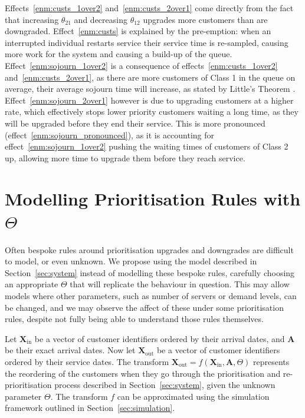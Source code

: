 \documentclass{article}
\begin{document}
Effects~\ref{enm:custs_1over2} and~\ref{enm:custs_2over1} come directly from the
fact that increasing $\theta_{21}$ and decreasing $\theta_{12}$ upgrades more
customers than are downgraded. Effect~\ref{enm:custs} is explained by the
pre-emption: when an interrupted individual restarts service their service time
is re-sampled, causing more work for the system and causing a build-up of the
queue.
Effect~\ref{enm:sojourn_1over2} is a consequence of
effects~\ref{enm:custs_1over2} and~\ref{enm:custs_2over1}, as there are more
customers of Class 1 in the queue on average, their average sojourn time will
increase, as stated by Little's Theorem \cite{little61}.
Effect~\ref{enm:sojourn_2over1} however is due to upgrading customers at a
higher rate, which effectively stops lower priority customers waiting a long
time, as they will be upgraded before they end their service.
This is more pronounced (effect~\ref{enm:sojourn_pronounced}), as it is
accounting for effect~\ref{enm:sojourn_1over2} pushing the waiting times of
customers of Class 2 up, allowing more time to upgrade them before they reach
service.



\section{Modelling Prioritisation Rules with $\Theta$}\label{sec:fitting}
Often bespoke rules around prioritisation upgrades and downgrades are difficult
to model, or even unknown. We propose using the model described in
Section~\ref{sec:system} instead of modelling these bespoke rules, carefully
choosing an appropriate $\Theta$ that will replicate the behaviour in question.
This may allow models where other parameters, such as number of servers or
demand levels, can be changed, and we may observe the affect of these under
some prioritisation rules, despite not fully being able to understand those
rules themselves.

Let $\mathbf{X}_{\text{in}}$ be a vector of customer identifiers ordered by
their arrival dates, and $\mathbf{A}$ be their exact arrival dates. Now let
$\mathbf{X}_{\text{out}}$ be a vector of customer identifiers ordered by their
service dates. The transform $\mathbf{X}_{\text{out}} = f\left(
\mathbf{X}_{\text{in}}, \mathbf{A}, \Theta \right)$ represents the reordering of
the customers when they go through the prioritisation and re-prioritisation
process described in Section~\ref{sec:system}, given the unknown parameter
$\Theta$. The transform $f$ can be approximated using the simulation framework
outlined in Section~\ref{sec:simulation}.
\end{document}

